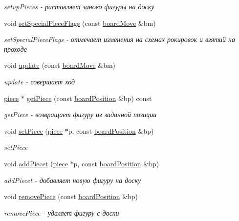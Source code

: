 \begin{DoxyCompactItemize}
\begin{DoxyCompactList}\small\item\em setup\+Pieces -\/ раставляет заново фигуры на доску \end{DoxyCompactList}\item 
void \hyperlink{classboard_a033c9329179afc730b3d725e54639c7c}{set\+Special\+Piece\+Flags} (const \hyperlink{classboard_move}{board\+Move} \&bm)
\begin{DoxyCompactList}\small\item\em set\+Special\+Piece\+Flags -\/ отмечает изменения на схемах рокировок и взятий на проходе \end{DoxyCompactList}\item 
void \hyperlink{classboard_a50bdaf6705c56c528f6c5ef8c0e3586e}{update} (const \hyperlink{classboard_move}{board\+Move} \&bm)
\begin{DoxyCompactList}\small\item\em update -\/ совершает ход \end{DoxyCompactList}\item 
\hyperlink{classpiece}{piece} $\ast$ \hyperlink{classboard_a8e2be38a28f6b631815741b70671e197}{get\+Piece} (const \hyperlink{classboard_position}{board\+Position} \&bp) const 
\begin{DoxyCompactList}\small\item\em get\+Piece -\/ возвращает фигуру из заданной позиции \end{DoxyCompactList}\item 
void \hyperlink{classboard_a7f11955cde955b7799fabab9df7224ad}{set\+Piece} (\hyperlink{classpiece}{piece} $\ast$p, const \hyperlink{classboard_position}{board\+Position} \&bp)
\begin{DoxyCompactList}\small\item\em set\+Piece \end{DoxyCompactList}\item 
void \hyperlink{classboard_a94bb90ebf9c98575a50d00fe4da3e1b3}{add\+Piecet} (\hyperlink{classpiece}{piece} $\ast$p, const \hyperlink{classboard_position}{board\+Position} \&bp)
\begin{DoxyCompactList}\small\item\em add\+Piecet -\/ добавляет новую фигуру на доску \end{DoxyCompactList}\item 
void \hyperlink{classboard_aa5a3a45d66a0b985446b10c56cd57fdf}{remove\+Piece} (const \hyperlink{classboard_position}{board\+Position} \&bp)
\begin{DoxyCompactList}\small\item\em remove\+Piece -\/ удаляет фигуру с доски \end{DoxyCompactList}\item 

\end{DoxyCompactItemize}

